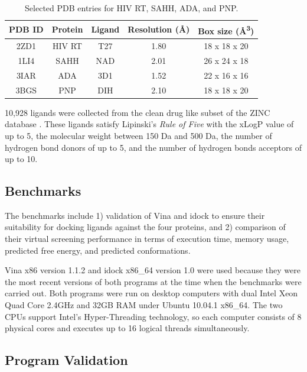 \begin{table}
\centering
\begin{tabular*}
{\linewidth}
{@{\extracolsep{\fill}}ccccc}
\toprule
PDB ID & Protein & Ligand & Resolution (\AA) & Box size (\AA\textsuperscript{3})\\
\midrule
2ZD1 & HIV RT & T27 & 1.80 & 18 x 18 x 20\\
1LI4 & SAHH   & NAD & 2.01 & 26 x 24 x 18\\
3IAR & ADA    & 3D1 & 1.52 & 22 x 16 x 16\\
3BGS & PNP    & DIH & 2.10 & 18 x 18 x 20\\
\bottomrule
\end{tabular*}
\caption{Selected PDB entries for HIV RT, SAHH, ADA, and PNP.}
\label{idock:SelectedPDBEntries}
\end{table}

10,928 ligands were collected from the clean drug like subset of the ZINC database \citep{532,1178}. These ligands satisfy Lipinski's \textit{Rule of Five} \citep{169} with the xLogP value of up to 5, the molecular weight between 150 Da and 500 Da, the number of hydrogen bond donors of up to 5, and the number of hydrogen bonds acceptors of up to 10.

\subsection{Benchmarks}

The benchmarks include 1) validation of Vina and idock to ensure their suitability for docking ligands against the four proteins, and 2) comparison of their virtual screening performance in terms of execution time, memory usage, predicted free energy, and predicted conformations.

Vina x86 version 1.1.2 and idock x86\_64 version 1.0 were used because they were the most recent versions of both programs at the time when the benchmarks were carried out. Both programs were run on desktop computers with dual Intel Xeon Quad Core 2.4GHz and 32GB RAM under Ubuntu 10.04.1 x86\_64. The two CPUs support Intel's Hyper-Threading technology, so each computer consists of 8 physical cores and executes up to 16 logical threads simultaneously.

\subsection{Program Validation}

